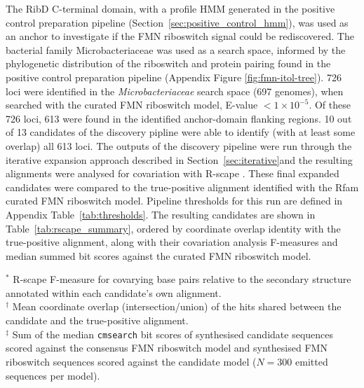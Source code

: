 The RibD C-terminal domain, with a profile \ac{HMM} generated in the positive control preparation pipeline (Section~\ref{sec:positive_control_hmm}), was used as an anchor to investigate if the \ac{FMN} riboswitch signal could be rediscovered.
The bacterial family Microbacteriaceae was used as a search space, informed by the phylogenetic distribution of the riboswitch and protein pairing found in the positive control preparation pipeline (Appendix Figure \ref{fig:fmn-itol-tree}).
726 loci were identified in the \emph{Microbacteriaceae} search space (697 genomes), when searched with the curated \ac{FMN} riboswitch model, E-value $< 1\times10^{-5}$. 
Of these 726 loci, 613 were found in the identified anchor-domain flanking regions.
10 out of 13 candidates of the discovery pipline were able to identify (with at least some overlap) all 613 loci.
The outputs of the discovery pipeline were run through the iterative expansion approach described in Section~\ref{sec:iterative}and the resulting alignments were analysed for covariation with R-scape \citep{Rivas2017}.
These final expanded candidates were compared to the true-positive alignment identified with the Rfam curated \ac{FMN} riboswitch model.
Pipeline thresholds for this run are defined in Appendix Table~\ref{tab:thresholds}.
The resulting candidates are shown in Table~\ref{tab:rscape_summary}, ordered by coordinate overlap identity with the true-positive alignment, along with their covariation analysis F-measures and median summed bit scores against the curated \ac{FMN} riboswitch model.

\begin{table}[H]
\centering
\footnotesize
\caption[FMN riboswitch rediscovery candidates]{\textbf{FMN riboswitch rediscovery candidates.}
    A summary of the candidate strucutred elements identified by the discovery and iterative expansion pipelines, and their covariation analysis results.
    Candidates are compared to a true-positive alignment and consensus model to assess their recovery of the known \ac{FMN} riboswitch signal.}
\label{tab:rscape_summary}


\vspace{4pt}
\begin{minipage}{\textwidth}
\raggedright
$^{*}$ R-scape F-measure for covarying base pairs relative to the secondary structure annotated within each candidate's own alignment.\\
$^{\dagger}$ Mean coordinate overlap (intersection/union) of the hits shared between the candidate and the true-positive alignment.\\
$^{\ddagger}$ Sum of the median \texttt{cmsearch} bit scores of synthesised candidate sequences scored against the consensus \ac{FMN} riboswitch model and synthesised \ac{FMN} riboswitch sequences scored against the candidate model ($N = 300$ emitted sequences per model).
\end{minipage}
\end{table}

